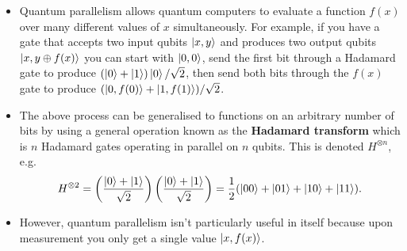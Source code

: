 \documentclass{article}
\begin{document}
\begin{itemize}
  \item Quantum parallelism allows quantum computers to evaluate a function $f(x)$ over many different values of $x$ simultaneously. For example, if you have a gate that accepts two input qubits $\ket{x, y}$ and produces two output qubits $\ket{x, y \oplus f(x)}$ you can start with $\ket{0, 0}$, send the first bit through a Hadamard gate to produce $(\ket{0} + \ket{1}) \ket{0} / \sqrt{2}$, then send both bits through the $f(x)$ gate to produce $(\ket{0, f(0)} + \ket{1, f(1)}) / \sqrt{2}$.

  \item The above process can be generalised to functions on an arbitrary number of bits by using a general operation known as the \textbf{Hadamard transform} which is $n$ Hadamard gates operating in parallel on $n$ qubits. This is denoted $H^{\otimes n}$, e.g. \[H^{\otimes 2} = \left( \frac{\ket{0} + \ket{1}}{\sqrt{2}} \right) \left( \frac{\ket{0} + \ket{1}}{\sqrt{2}} \right) = \frac{1}{2} (\ket{0 0} + \ket{0 1} + \ket{1 0} + \ket{1 1}).\]

  \item However, quantum parallelism isn't particularly useful in itself because upon measurement you only get a single value $\ket{x, f(x)}$.
\end{itemize}
\end{document}
